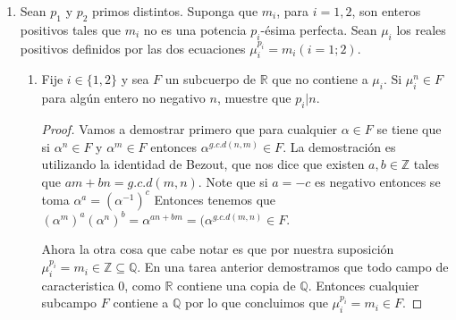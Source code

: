 \documentclass[letter,twoside,12pt]{article}
\begin{document}
\begin{enumerate}
\begin{proof}
Considere el polinomio $ x^2-\alpha x+\beta $. Efectivamente este polinomi se puede descomponer en $ \mathbb{R} $ como $ (x-\pi)(x-e) $. La fórmula cuadrática nos da una expresión para calcular las raices de este polinomio.

\begin{equation}
x_{1,2}=\frac{\alpha \pm \sqrt{\alpha^2-4\beta}}{2} \nonumber
\end{equation}

Donde $ x_1 $ y $ x_2 $ van a ser $ \pi $ o $ e $. Sabemos que la suma, resta y división de algebraicos es algebraico. Tan solo falta demostrar que la raiz de algebraicos es algebraica y esto es así. Suponiendo que la raiz no esta contenida en una extension algebraica podemos hacer una extensión de grado 2 sobre esta extensión para agregarla (partiendo el anillo de polinomios por el polinomio $ x^2-\alpha $, por ejemplo) y la extensión vista desde $ \mathbb{Q} $ seguiria siendo algebraica por el punto 3(a) de esta tarea.

Pero esto implicaria que tanto $ e $ como $ \pi $ son algebráicos lo cual es una contradicción. Concluimos que por lo menos uno de los dos entre $ \alpha $ y $ \beta $ son trascendentes.
\end{proof}

\item Sean $ p_1 $ y $ p_2 $ primos distintos. Suponga que $ m_i $, para $ i = 1, 2 $, son enteros positivos tales que $ m_i $ no es
una potencia $ p_i $-ésima perfecta. Sean $ \mu_i $ los reales positivos definidos por las dos ecuaciones $ \mu_i^{p_i} = m_i
(i = 1; 2) $.
\begin{enumerate}
\item Fije $ i \in \{1,2\} $ y sea $ F $ un subcuerpo de $ \mathbb{R} $ que no contiene a $ \mu_i $. Si $ \mu_i^n \in F $
para algún entero no
negativo $ n $, muestre que $ p_i | n $.
\begin{proof}
Vamos a demostrar primero que para cualquier $ \alpha \in F $ se tiene que si $ \alpha^n \in F $ y $ \alpha^m \in F $ entonces $ \alpha^{g.c.d(n,m)} \in F $. La demostración es utilizando la identidad de Bezout, que nos dice que existen $ a,b \in \mathbb{Z} $ tales que $ am+bn=g.c.d(m,n) $. Note que si $ a= -c $ es negativo entonces se toma $ \alpha^a=(\alpha^{-1})^c $ Entonces tenemos que $ (\alpha^m)^a(\alpha^n)^b = \alpha^{an+bm}=(\alpha^{g.c.d(m,n)} \in F $.

Ahora la otra cosa que cabe notar es que por nuestra suposición $ \mu_i^{p_i}=m_i \in \mathbb{Z} \subseteq \mathbb{Q} $. En una tarea anterior demostramos que todo campo de caracteristica 0, como $ \mathbb{R} $ contiene una copia de $ \mathbb{Q} $. Entonces cualquier subcampo $ F $ contiene a $ \mathbb{Q} $ por lo que concluimos que $ \mu_i^{p_i}=m_i \in F $. 


\end{proof}
\end{enumerate}
\end{enumerate}
\end{document}
